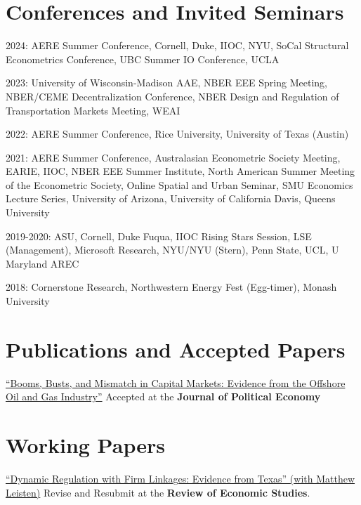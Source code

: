 \documentclass[margin,line]{res}
\newenvironment{list1}{
  \begin{list}{\ding{113}}{%
      \setlength{\itemsep}{.025in}
      \setlength{\parsep}{0in} \setlength{\parskip}{0in}
      \setlength{\topsep}{0in} \setlength{\partopsep}{0in}
      \setlength{\leftmargin}{0.17in}}}{\end{list}}
\begin{document}
\begin{resume}
\section{ Conferences and Invited Seminars}
\begin{list1}
\item[] 2024: AERE Summer Conference, Cornell, Duke, IIOC, NYU, SoCal Structural Econometrics Conference, UBC Summer IO Conference, UCLA
\item[] 2023: University of Wisconsin-Madison AAE, NBER EEE Spring Meeting, NBER/CEME Decentralization Conference, NBER Design and Regulation of Transportation Markets Meeting, WEAI
\item[] 2022: AERE Summer Conference, Rice University, University of Texas (Austin)
\item[] 2021: AERE Summer Conference, Australasian Econometric Society Meeting, EARIE, IIOC, NBER EEE Summer Institute, North American Summer Meeting of the Econometric Society, Online Spatial and Urban Seminar, SMU Economics Lecture Series, University of Arizona, University of California Davis, Queens University
\item[] 2019-2020: ASU, Cornell, Duke Fuqua, IIOC Rising Stars Session, LSE (Management), Microsoft Research, NYU/NYU (Stern), Penn State, UCL, U Maryland AREC
\item[] 2018:  Cornerstone Research, Northwestern Energy Fest (Egg-timer), Monash University
\end{list1}

\section{Publications and Accepted Papers}
\begin{list1}
\item[] \href{https://nvreug.github.io/paper/bbm.pdf}{``Booms, Busts, and Mismatch in Capital Markets: Evidence from the Offshore Oil and Gas Industry''} Accepted at the \textbf{Journal of Political Economy}
\end{list1}

\section{Working Papers}
\begin{list1}

\item[] \href{ https://www.dropbox.com/s/ceqvc55q4hxpi4b/Dynamic_Regulation_with_Firm_Linkages.pdf?dl=0}{``Dynamic Regulation with Firm Linkages: Evidence from Texas'' (with Matthew Leisten)} Revise and Resubmit at the \textbf{Review of Economic Studies}.


\end{list1}
\end{resume}
\end{document}
